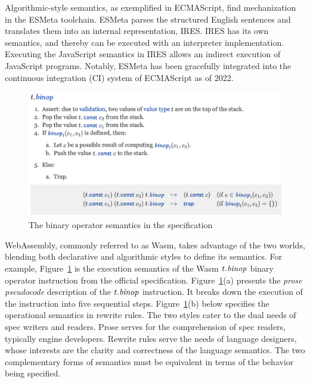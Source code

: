 Algorithmic-style semantics, as exemplified in ECMAScript, find mechanization in the ESMeta toolchain. ESMeta parses the structured English sentences and translates them into an internal representation, IRES. IRES has its own semantics, and thereby can be executed with an interpreter implementation. Executing the JavaScript semantics in IRES allows an indirect execution of JavaScript programs.
Notably, ESMeta has been gracefully integrated into the continuous integration (CI) system of ECMAScript as of 2022.

\begin{figure}[t]
\includegraphics[width=.7\textwidth]{../img/spec.png}
\caption{The binary operator semantics in the specification}
\label{fig:spec}
\end{figure}

WebAssembly, commonly referred to as Wasm, takes advantage of the two worlds, blending both declarative and algorithmic styles to define its semantics. For example, Figure~\ref{fig:spec} is the execution semantics of the Wasm $t.\mbox{\emph{binop}}$ binary operator instruction from the official specification. Figure~\ref{fig:spec}(a) presents the 
\textit{prose pseudocode} description of the $t.\mbox{\emph{binop}}$ instruction. It breaks down the execution of the instruction into five sequential steps. Figure~\ref{fig:spec}(b) below specifies the operational semantics in rewrite rules. The two styles cater to the dual needs of spec writers and readers. Prose serves for the comprehension of spec readers, typically engine developers. Rewrite rules serve the needs of language designers, whose interests are the clarity and correctness of the language semantics. The two complementary forms of semantics must be equivalent in terms of the behavior being specified.

